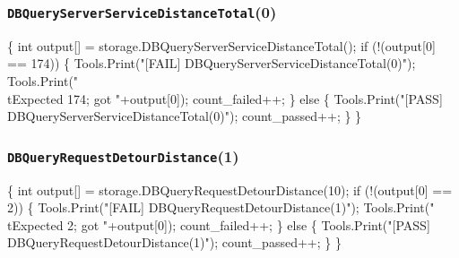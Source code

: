 \documentclass{article}
\def\nwendcode{\endtrivlist \endgroup}
\let\nwdocspar=\par
\begin{document}
\subsubsection{{\tt{}DBQueryServerServiceDistanceTotal}(0)}
\nwenddocs{}\endmoddef{}
\{
  int output[] = storage.DBQueryServerServiceDistanceTotal();
  if (!(output[0] == 174)) \{
    Tools.Print("[FAIL] DBQueryServerServiceDistanceTotal(0)");
    Tools.Print("\\tExpected 174; got "+output[0]);
    count_failed++;
  \} else \{
    Tools.Print("[PASS] DBQueryServerServiceDistanceTotal(0)");
    count_passed++;
  \}
\}
\nwendcode{}\nwdocspar
\subsubsection{{\tt{}DBQueryRequestDetourDistance}(1)}
\nwenddocs{}\endmoddef{}
\{
  int output[] = storage.DBQueryRequestDetourDistance(10);
  if (!(output[0] == 2)) \{
    Tools.Print("[FAIL] DBQueryRequestDetourDistance(1)");
    Tools.Print("\\tExpected 2; got "+output[0]);
    count_failed++;
  \} else \{
    Tools.Print("[PASS] DBQueryRequestDetourDistance(1)");
    count_passed++;
  \}
\}
\nwendcode{}\nwdocspar
\end{document}
